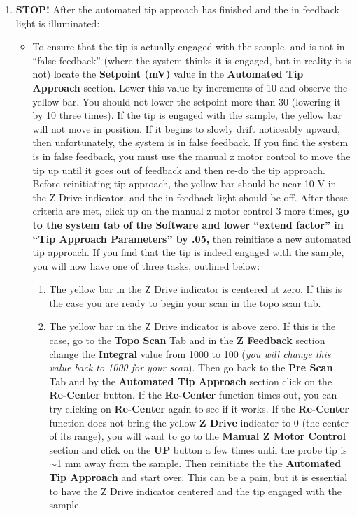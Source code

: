 \documentclass{../lab}
\begin{document}
\begin{enumerate}
    \item\textbf{STOP!} After the automated tip approach has finished and the in feedback light is illuminated:
    \begin{itemize}
        \item To ensure that the tip is actually engaged with the sample, and is not in ``false feedback'' (where the system thinks it is engaged, but in reality it is not) locate the \textbf{Setpoint (mV) }value in the \textbf{Automated Tip Approach} section. Lower this value by increments of 10 and observe the yellow bar. You should not lower the setpoint more than 30 (lowering it by 10 three times). If the tip is engaged with the sample, the yellow bar will not move in position. If it begins to slowly drift noticeably upward, then unfortunately, the system is in false feedback. If you find the system is in false feedback, you must use the manual z motor control to move the tip up until it goes out of feedback and then re-do the tip approach. Before reinitiating tip approach, the yellow bar should be near 10 V in the Z Drive indicator, and the in feedback light should be off. After these criteria are met, click up on the manual z motor control 3 more times, \textbf{go to the system tab of the Software and lower ``extend factor'' in ``Tip Approach Parameters'' by .05,} then reinitiate a new automated tip approach. If you find that the tip is indeed engaged with the sample, you will now have one of three tasks, outlined below:
        \begin{enumerate}
            \item The yellow bar in the Z Drive indicator is centered at zero. If this is the case you are ready to begin your scan in the topo scan tab.
            
            \item The yellow bar in the Z Drive indicator is above zero. If this is the case, go to the \textbf{Topo Scan }Tab and in the \textbf{Z Feedback }section change the \textbf{Integral }value from 1000 to 100 (\emph{you will change this value back to 1000 for your scan}).  Then go back to the \textbf{Pre Scan }Tab and by the \textbf{Automated Tip Approach }section click on the \textbf{Re-Center} button.  If the \textbf{Re-Center }function times out, you can try clicking on \textbf{Re-Center }again to see if it works.  If the \textbf{Re-Center }function does not bring the yellow \textbf{Z Drive }indicator to 0 (the center of its range), you will want to go to the \textbf{Manual Z Motor Control }section and click on the \textbf{UP }button a few times until the probe tip is $\sim$1 mm away from the sample.  Then reinitiate the the \textbf{Automated Tip Approach} and start over. This can be a pain, but it is essential to have the Z Drive indicator centered and the tip engaged with the sample.
            

\end{enumerate}
\end{itemize}
\end{enumerate}
\end{document}
